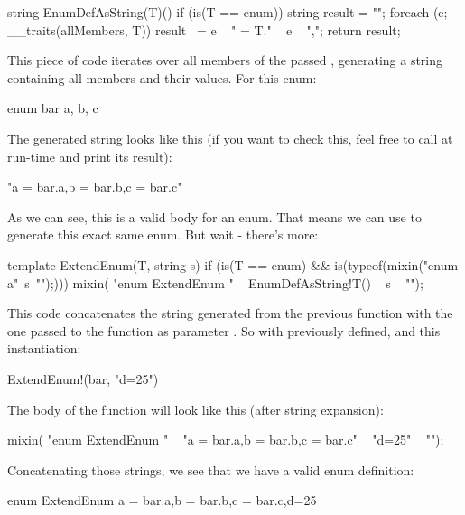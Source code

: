 \begin{dcode}
string EnumDefAsString(T)() 
if (is(T == enum)) 
{
   string result = "";
   foreach (e; __traits(allMembers, T))
       result ~= e ~ " = T." ~ e ~ ",";
   return result;
}
\end{dcode}

This piece of code iterates over all members of the passed ,
generating a string containing all members and their values. For
this enum:

\begin{dcode}
enum bar
{
    a, b, c
}
\end{dcode}

The generated string looks like this (if you want to check this,
feel free to call  at run-time and print its result):

\begin{dcode}
"a = bar.a,b = bar.b,c = bar.c"
\end{dcode}

As we can see, this is a valid body for an enum. That means we can use
\DD{()} to generate this exact same enum. But wait - there's more:

\begin{dcode}
template ExtendEnum(T, string s)
   if (is(T == enum) &&
   is(typeof({mixin("enum a{"~s~"}");})))
{
   mixin(
   "enum ExtendEnum {"
   ~ EnumDefAsString!T()
   ~ s
   ~ "}");
}
\end{dcode}

This code concatenates the string generated from the previous function
with the one passed to the function as parameter . So with  previously defined, and this instantiation:

\begin{dcode}
ExtendEnum!(bar, "d=25")
\end{dcode}

The body of the function will look like this (after string expansion):

\begin{dcode}
mixin(
   "enum ExtendEnum {"
   ~ "a = bar.a,b = bar.b,c = bar.c"
   ~ "d=25"
   ~ "}");
\end{dcode}

Concatenating those strings, we see that we have a valid enum definition:

\begin{dcode}
enum ExtendEnum {a = bar.a,b = bar.b,c = bar.c,d=25}
\end{dcode}

